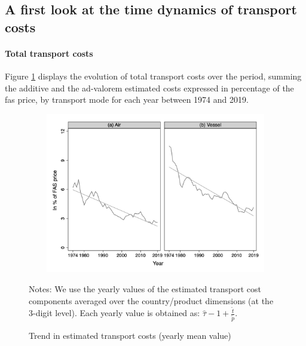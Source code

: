 \documentclass[a4paper,11pt]{article}
\begin{document}
\subsection{A first look at the time dynamics of transport costs}


\paragraph{Total transport costs} Figure \ref{fig:Trends_in_TC} displays the evolution of total transport costs over the period, summing the additive and the ad-valorem estimated costs expressed in percentage of the fas price, by transport mode for each year between 1974 and 2019.

\begin{figure}[htbp]
\caption{Trend in estimated transport costs (yearly mean value)}
\label{fig:Trends_in_TC}
\begin{center}
\includegraphics[width=14cm, height=7cm]{Figure2_Trend_of_totalTC_bymode.jpg}

\begin{minipage} [c]  {5in} \scriptsize%
Notes: We use the yearly values of the estimated transport cost components averaged over the country/product dimensions (at the 3-digit level). Each yearly value is obtained as: $\widehat{\tau}-1+\frac{\widehat{t}}{\widetilde{p}}$.
\end{minipage}
\end{center}
\end{figure}

\end{document}
